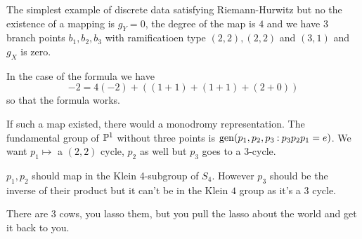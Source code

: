 \documentclass[12pt]{memoir}
\begin{document}
 \begin{Ex}
    The simplest example of discrete data satisfying Riemann-Hurwitz but no the existence of a mapping is $g_Y=0$, the degree of the map is $4$ and we have $3$ branch points $b_1,b_2,b_3$ with ramificatioen type $(2,2),(2,2)$ and $(3,1)$ and $g_X$ is zero.\par
    In the case of the formula we have 
    $$-2=4(-2)+((1+1)+(1+1)+(2+0))$$
    so that the formula works.\par
    If such a map existed, there would a monodromy representation. The fundamental group of $\mathbb{P}^1$ without three points is $\operatorname{gen}(p_1,p_2,p_3\mathbin{:} p_3p_2p_1=e)$. We want $p_1\mapsto$ a $(2,2)$ cycle, $p_2$ as well but $p_3$ goes to a $3$-cycle.\par
    $p_1,p_2$ should map in the Klein 4-subgroup of $S_4$. However $p_3$ should be the inverse of their product but it can't be in the Klein $4$ group as it's a 3 cycle.
 \end{Ex}

 \begin{Rmk}
    There are 3 cows, you lasso them, but you pull the lasso about the world and get it back to you.
 \end{Rmk}

 

\ifx\nextra\undefined
\printindex
\else\fi
\nocite{*}


\end{document}
